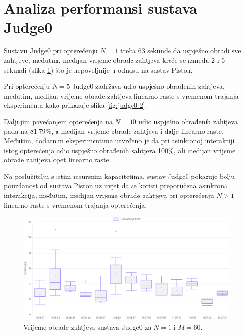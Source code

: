 \documentclass[times, utf8, diplomski]{fer}
\begin{document}
\pagebreak

\section{Analiza performansi sustava Judge0}
Sustavu Judge0 pri opterećenju $N=1$ treba 63 sekunde da uspješno obradi sve zahtjeve, međutim, medijan vrijeme obrade zahtjeva kreće se između 2 i 5 sekundi (slika \ref{fig:judge0-1}) što je nepovoljnije u odnosu na sustav Piston. 

Pri opterećenju $N=5$ Judge0 zadržava udio uspješno obrađenih zahtjeva, međutim, medijan vrijeme obrade zahtjeva linearno raste s vremenom trajanja eksperimenta kako prikazuje slika \ref{fig:judge0-2}.

Daljnjim povećanjem opterećenja na $N=10$ udio uspješno obrađenih zahtjeva pada na 81,79\%, a medijan vrijeme obrade zahtjeva i dalje linearno raste. Međutim, dodatnim eksperimentima utvrđeno je da pri asinkronoj interakciji istog opterećenja udio uspješno obrađenih zahtjeva 100\%, ali medijan vrijeme obrade zahtjeva opet linearno raste.

Na poslužitelju s istim resursnim kapacitetima, sustav Judge0 pokazuje bolju pouzdanost od sustava Piston uz uvjet da se koristi preporučena asinkrona interakcija, međutim, medijan vrijeme obrade zahtjeva pri opterećenju $N>1$ linearno raste s vremenom trajanja opterećenja.

\begin{figure}[htb]
	\centering
	\includegraphics[width=\textwidth]{images/Judge0 TAT for 1 5s.png}
	\caption{
		Vrijeme obrade zahtjeva sustava Judge0 za $N=1$ i $M=60$.
	}
	\label{fig:judge0-1}
\end{figure}

\pagebreak
\end{document}
